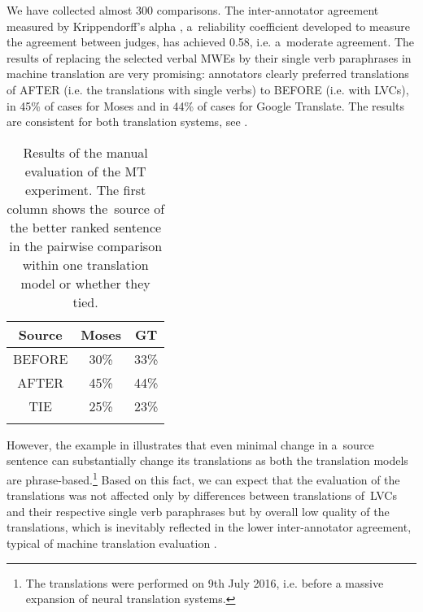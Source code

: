 \documentclass[output=paper
,modfonts
,nonflat]{langsci/langscibook}
\begin{document}
We have collected almost 300 comparisons. The inter-annotator agreement 
measured by Krippendorff's alpha \citep{Krippendorff2007}, a~reliability 
coefficient developed to measure the agreement between judges, has achieved
0.58, i.e. a~moderate agreement. The results of replacing the selected verbal 
MWEs by their single verb paraphrases in machine translation are very 
promising: annotators clearly preferred translations of AFTER  (i.e. the 
translations with single verbs) to BEFORE (i.e. with LVCs), in 45\% of cases 
for Moses and in 44\% of cases for Google Translate. The results are consistent
for both translation systems, see .

\begin{table}[tb]
	\centering
	\begin{tabular}{ccc}
	\lsptoprule
		Source & Moses   & GT    \\ \midrule
		BEFORE & 30\%    & 33\%  \\
		AFTER  & 45\%    & 44\%  \\
		TIE    & 25\%    & 23\%  \\
	\lspbottomrule
	\end{tabular}
	\caption{Results of the manual evaluation of the MT experiment. The first 
	column shows the~source of the better ranked sentence in the pairwise 
	comparison within one translation model or whether they tied.}
	\label{annotation}
\end{table}

However, the example in  illustrates that even minimal change in 
a~source sentence can substantially change its translations as both the 
translation models are phrase-based.\footnote{The translations were 
performed on 9th July 2016, i.e. before a massive expansion of neural 
translation systems.} Based on this fact, we can expect that the evaluation of 
the translations was not affected only by differences between translations 
of~LVCs and their respective single verb paraphrases but by overall low quality 
of the translations, which is inevitably reflected in the lower inter-annotator 
agreement, typical of machine translation evaluation \citep{wmt13}. 
\end{document}
